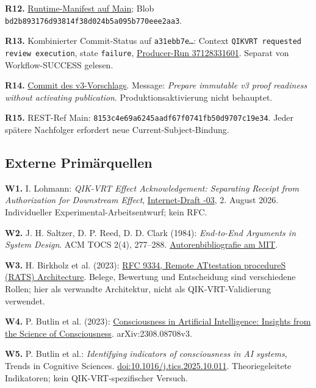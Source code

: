 \begin{cols}
\textbf{R12.} \href{https://github.com/ingolf-lohmann/qik-vrt/blob/8153c4e69a6245aadf67f0741fb50d9707c19e34/runtime/RUNTIME_DEPENDENCY_MANIFEST.json}{Runtime-Manifest auf Main}; Blob \nolinkurl{bd2b893176d93814f38d024b5a095b770eee2aa3}.

\textbf{R13.} Kombinierter Commit-Status auf \texttt{a31ebb7e…}: Context \texttt{QIKVRT requested review execution}, state \texttt{failure}, \href{https://github.com/ingolf-lohmann/qik-vrt/actions/runs/37128331601}{Producer-Run 37128331601}. Separat von Workflow-SUCCESS gelesen.

\textbf{R14.} \href{https://github.com/ingolf-lohmann/qik-vrt/commit/a31ebb7eb810334c4f00ebadd4604fa5cf45abea}{Commit des v3-Vorschlags}. Message: \emph{Prepare immutable v3 proof readiness without activating publication}. Produktionsaktivierung nicht behauptet.

\textbf{R15.} REST-Ref Main: \nolinkurl{8153c4e69a6245aadf67f0741fb50d9707c19e34}. Jeder spätere Nachfolger erfordert neue Current-Subject-Bindung.

\subsection*{Externe Primärquellen}
\textbf{W1.} I. Lohmann: \emph{QIK-VRT Effect Acknowledgement: Separating Receipt from Authorization for Downstream Effect}, \href{https://datatracker.ietf.org/doc/draft-lohmann-qikvrt-effect-ack/}{Internet-Draft -03}, 2. August 2026. Individueller Experimental-Arbeitsentwurf; kein RFC.

\textbf{W2.} J. H. Saltzer, D. P. Reed, D. D. Clark (1984): \emph{End-to-End Arguments in System Design}. ACM TOCS 2(4), 277–288. \href{https://web.mit.edu/saltzer/www/publications/pubs.html}{Autorenbibliografie am MIT}.

\textbf{W3.} H. Birkholz et al. (2023): \href{https://www.rfc-editor.org/rfc/rfc9334}{RFC 9334, Remote ATtestation procedureS (RATS) Architecture}. Belege, Bewertung und Entscheidung sind verschiedene Rollen; hier als verwandte Architektur, nicht als QIK-VRT-Validierung verwendet.

\textbf{W4.} P. Butlin et al. (2023): \href{https://arxiv.org/abs/2308.08708}{Consciousness in Artificial Intelligence: Insights from the Science of Consciousness}. arXiv:2308.08708v3.

\textbf{W5.} P. Butlin et al.: \emph{Identifying indicators of consciousness in AI systems}, Trends in Cognitive Sciences. \href{https://doi.org/10.1016/j.tics.2025.10.011}{doi:10.1016/j.tics.2025.10.011}. Theoriegeleitete Indikatoren; kein QIK-VRT-spezifischer Versuch.


\end{cols}
